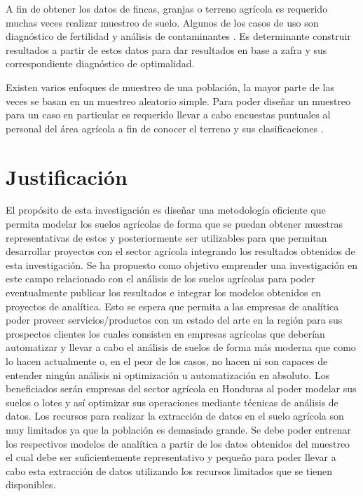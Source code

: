 \documentclass{report}
\begin{document}
\bigbreak

A fin de obtener los datos de fincas, granjas o terreno agrícola es requerido muchas veces realizar muestreo de suelo. Algunos de los casos de uso son diagnóstico de fertilidad \cite{lassaga-2011} y análisis de contaminantes \cite{gobpe-ministerio-del-ambiente-2014}. Es determinante construir resultados a partir de estos datos para dar resultados en base a zafra y sus correspondiente diagnóstico de optimalidad.

\bigbreak

Existen varios enfoques de muestreo de una población, la mayor parte de las veces se basan en un muestreo aleatorio simple. Para poder diseñar un muestreo para un caso en particular es requerido llevar a cabo encuestas puntuales al personal del área agrícola a fin de conocer el terreno y sus clasificaciones \cite{organizacion-de-las-naciones-unidas-para-la-agricultura-y-la-alimentacion-1990}.

\section{Justificación}

El propósito de esta investigación es diseñar una metodología eficiente que permita modelar los suelos agrícolas de forma que se puedan obtener muestras representativas de estos y posteriormente ser utilizables para que permitan desarrollar proyectos con el sector agrícola integrando los resultados obtenidos de esta investigación. Se ha propuesto como objetivo emprender una investigación en este campo relacionado con el análisis de los suelos agrícolas para poder eventualmente publicar los resultados e integrar los modelos obtenidos en proyectos de analítica. Esto se espera que permita a las empresas de analítica poder proveer servicios/productos con un estado del arte en la región para sus prospectos clientes los cuales consisten en empresas agrícolas que deberían automatizar y llevar a cabo el análisis de suelos de forma más moderna que como lo hacen actualmente o, en el peor de los casos, no hacen ni son capaces de entender ningún análisis ni optimización u automatización en absoluto. Los beneficiados serán empresas del sector agrícola en Honduras al poder modelar sus suelos o lotes y así optimizar sus operaciones mediante técnicas de análisis de datos. Los recursos para realizar la extracción de datos en el suelo agrícola son muy limitados ya que la población es demasiado grande. Se debe poder entrenar los respectivos modelos de analítica a partir de los datos obtenidos del muestreo el cual debe ser suficientemente representativo y pequeño para poder llevar a cabo esta extracción de datos utilizando los recursos limitados que se tienen disponibles.
\end{document}

